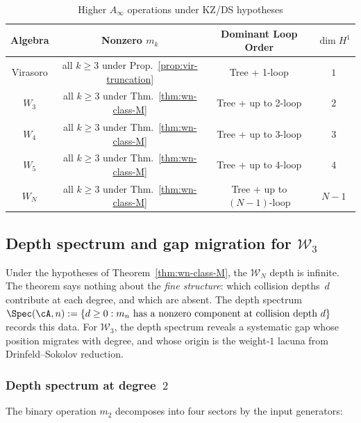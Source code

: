 \begin{table}[h]
\centering
\caption{Higher $A_\infty$ operations under KZ/DS hypotheses}
\begin{tabular}{|c|c|c|c|}
\hline
Algebra & Nonzero $m_k$ & Dominant Loop Order & $\dim H^1$ \\
\hline
Virasoro & all $k \geq 3$ under Prop.~\ref{prop:vir-truncation} & Tree + 1-loop & $1$ \\
$W_3$ & all $k \geq 3$ under Thm.~\ref{thm:wn-class-M} & Tree + up to 2-loop & $2$ \\
$W_4$ & all $k \geq 3$ under Thm.~\ref{thm:wn-class-M} & Tree + up to 3-loop & $3$ \\
$W_5$ & all $k \geq 3$ under Thm.~\ref{thm:wn-class-M} & Tree + up to 4-loop & $4$ \\
$W_N$ & all $k \geq 3$ under Thm.~\ref{thm:wn-class-M} & Tree + up to $(N\!-\!1)$-loop & $N\!-\!1$ \\
\hline
\end{tabular}
\end{table}


\subsection{Depth spectrum and gap migration for
\texorpdfstring{$\mathcal{W}_3$}{W\_3}}
\label{subsec:w3-depth-spectrum}

Under the hypotheses of Theorem~\ref{thm:wn-class-M}, the
$\mathcal{W}_N$ depth is infinite. The theorem says nothing about the
\emph{fine structure}: which collision depths~$d$
contribute at each degree, and which are absent. The depth
spectrum $\Spec(\cA, n) := \{d \ge 0 : m_n \text{ has a nonzero
component at collision depth } d\}$ records this data. For
$\mathcal{W}_3$, the depth spectrum reveals a systematic gap
whose position migrates with degree, and whose origin is
the weight-$1$ lacuna from Drinfeld--Sokolov reduction.

\subsubsection{Depth spectrum at degree~$2$}
\label{subsubsec:w3-depth-degree-2}

The binary operation $m_2$ decomposes into four sectors by the
input generators:


